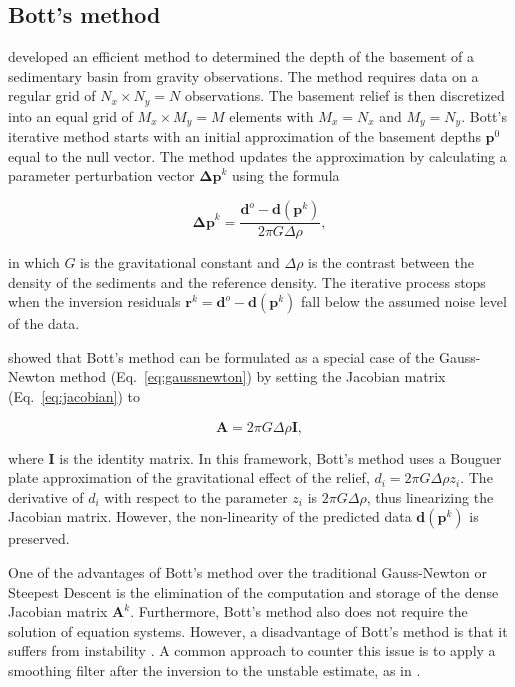 \documentclass[extra,mreferee]{gji}
\begin{document}
\subsection{Bott's method}

\citet{bott1960} developed an efficient method to determined the depth of the
basement of a sedimentary basin from gravity observations.
The method requires data on a regular grid of $N_x \times N_y = N$
observations.
The basement relief is then discretized into an equal grid of $M_x \times
M_y = M$ elements with $M_x = N_x$ and $M_y = N_y$.
Bott's iterative method starts with an initial approximation of the basement
depths $\mathbf{p}^0$ equal to the null vector.
The method updates the approximation by calculating a parameter perturbation
vector $\mathbf{\Delta p}^k$ using the formula

\begin{equation}
    \mathbf{\Delta p}^k =
        \dfrac{\mathbf{d}^o - \mathbf{d}(\mathbf{p}^k)}{2\pi G \Delta \rho},
    \label{eq:bott}
\end{equation}

\noindent
in which $G$ is the gravitational constant and $\Delta \rho$ is the
contrast between the density of the sediments and the reference density.
The iterative process stops when the inversion residuals
$\mathbf{r}^k = \mathbf{d}^o - \mathbf{d}(\mathbf{p}^k)$ fall below the assumed noise level
of the data.

\citet{silva2014} showed that Bott's method can be formulated as
a special case of the Gauss-Newton method (Eq.~\ref{eq:gaussnewton})
by setting the Jacobian matrix (Eq.~\ref{eq:jacobian}) to

\begin{equation}
    \mathbf{A} = 2\pi G \Delta \rho \mathbf{I},
    \label{eq:bott-gaussnewton}
\end{equation}

\noindent
where $\mathbf{I}$ is the identity matrix.
In this framework,
Bott's method uses a Bouguer plate approximation of the gravitational effect of
the relief, $d_i = 2\pi G \Delta\rho z_i$.
The derivative of $d_i$ with respect to the parameter $z_i$ is
$2\pi G \Delta \rho$, thus linearizing the Jacobian matrix.
However, the non-linearity of the predicted data $\mathbf{d}(\mathbf{p}^k)$ is
preserved.

One of the advantages of Bott's method over the traditional Gauss-Newton or
Steepest Descent is the elimination of the computation and storage of the dense
Jacobian matrix $\mathbf{A}^k$.
Furthermore, Bott's method also does not require the solution of equation
systems.
However, a disadvantage of Bott's method is that it suffers from instability
\citep{silva2014}.
A common approach to counter this issue is to apply a smoothing filter after
the inversion to the unstable estimate, as in \citet{silva2014}.
\end{document}
